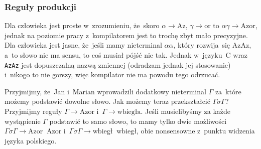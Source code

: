 \documentclass[10pt,t]{beamer}
\begin{document}
\begin{frame}
  \frametitle{Reguły produkcji}


  Dla człowieka jest proste w~zrozumieniu, że~skoro $\alpha \to \text{Az}$,
  $\gamma \to \text{or}$ to $\alpha\gamma \to \text{Azor}$, jednak na poziomie pracy
  z~kompilatorem jest to
  trochę zbyt mało precyzyjne. Dla człowieka jest jasne, że~jeśli mamy
  nieterminal $\alpha\alpha$, który rozwija~się $\text{AzAz}$, a~to słowo nie ma
  sensu, to coś musiał pójść nie tak. Jednak w~języku~C wraz \texttt{AzAz}
  jest dopuszczalną nazwą zmiennej (odradzam jednak jej stosowanie)
  i~nikogo to nie gorszy, więc kompilator nie ma powodu tego odrzucać.

  Przyjmijmy, że~Jan i~Marian wprowadzili dodatkowy nieterminal
  $\Gamma$ za~które możemy podstawić dowolne słowo. Jak możemy teraz
  przekształcić $\Gamma\sigma\Gamma$? Przyjmijmy reguły $\Gamma \to \text{Azor}$
  i~$\Gamma \to \text{wbiegła}$. Jeśli musielibyśmy za każde wystąpienie
  $\Gamma$ podstawić to samo słowo, to mamy tylko dwie możliwości
  $\Gamma\sigma\Gamma \to \text{Azor} \; \; \text{Azor}$
  i~$\Gamma\sigma\Gamma \to \text{wbiegł} \; \; \text{wbiegł}$, obie nonsensowne
  z~punktu widzenia języka polskiego.




























\end{frame}
\end{document}
